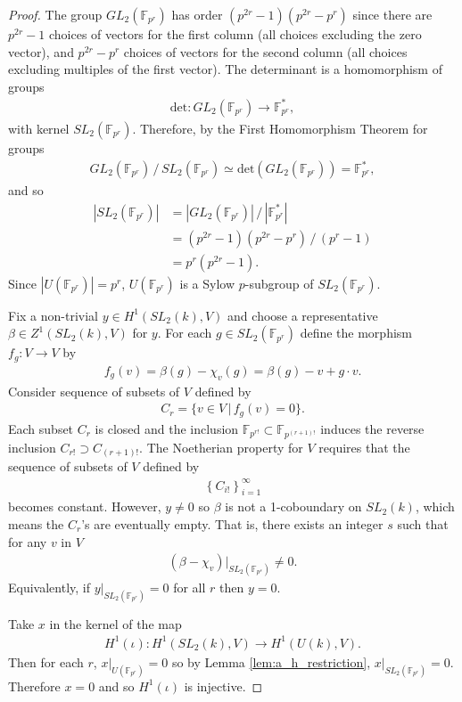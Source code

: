 \begin{proof}
	The group $GL_2(\mathbb{F}_{p^r})$ has order $(p^{2r} - 1)(p^{2r} - p^r)$ since there are $p^{2r} - 1$ choices of vectors for the first column (all choices excluding the zero vector), and $p^{2r} - p^r$ choices of vectors for the second column (all choices excluding multiples of the first vector). The determinant is a homomorphism of groups
	\begin{align}
		\mathrm{det}:GL_2(\mathbb{F}_{p^r}) \rightarrow \mathbb{F}^*_{p^r},
	\end{align}
	with kernel $SL_2(\mathbb{F}_{p^r})$. Therefore, by the First Homomorphism Theorem for groups
	\begin{align}
		GL_2(\mathbb{F}_{p^r})\,/\,SL_2(\mathbb{F}_{p^r}) \simeq \mathrm{det}(GL_2(\mathbb{F}_{p^r})) = \mathbb{F}^*_{p^r},
	\end{align}
	and so
	\begin{align*}
		|SL_2(\mathbb{F}_{p^r})|
		&=  |GL_2(\mathbb{F}_{p^r})|\,/\,|\mathbb{F}^*_{p^r}|\\
		&=  (p^{2r} - 1)(p^{2r} - p^r)\,/\,(p^r - 1)\\
		&=  p^r(p^{2r} - 1).
	\end{align*}
	Since $|U(\mathbb{F}_{p^r})| = p^r$, $U(\mathbb{F}_{p^r})$ is a Sylow $p$-subgroup of $SL_2(\mathbb{F}_{p^r})$.
	
	Fix a non-trivial $y\in H^1(SL_2(k), V)$ and choose a representative $\beta\in Z^1(SL_2(k), V)$ for $y$. For each $g\in SL_2(\mathbb{F}_{p^r})$ define the morphism $f_g:V\rightarrow V$ by
	\begin{align}
		f_g(v) = \beta(g) - \chi_v(g) = \beta(g) - v + g\cdot v.
	\end{align}
	Consider sequence of subsets of $V$ defined by
	\begin{align}
		C_r = \{v \in V \,|\, f_g(v) = 0\}.
	\end{align}
	Each subset $C_r$ is closed and the inclusion $\mathbb{F}_{p^{r!}} \subset \mathbb{F}_{p^{(r+1)!}}$ induces the reverse inclusion $C_{r!} \supset C_{(r+1)!}$. The Noetherian property for $V$ requires that the sequence of subsets of $V$ defined by
	\begin{align}
		\left\{C_{i!}\right\}_{i = 1}^\infty
	\end{align}
	becomes constant. However, $y\neq 0$ so $\beta$ is not a 1-coboundary on $SL_2(k)$, which means the $C_r$'s are eventually empty. That is, there exists an integer $s$ such that for any $v$ in $V$
	\begin{align}
		(\beta - \chi_v)|_{SL_2(\mathbb{F}_{p^s})} \neq 0.
	\end{align}
	Equivalently, if $y|_{SL_2(\mathbb{F}_{p^r})} = 0$ for all $r$ then $y = 0$.
	
	Take $x$ in the kernel of the map 
	\begin{align}
	 H^1(\iota) : H^1(SL_2(k), V) \rightarrow H^1(U(k), V).
       \end{align}
	Then for each $r$, $x|_{U(\mathbb{F}_{p^r})} = 0$ so by Lemma \ref{lem:a_h_restriction}, $x|_{SL_2(\mathbb{F}_{p^r})} = 0$. Therefore $x=0$ and so $H^1(\iota)$ is injective.
\end{proof}

